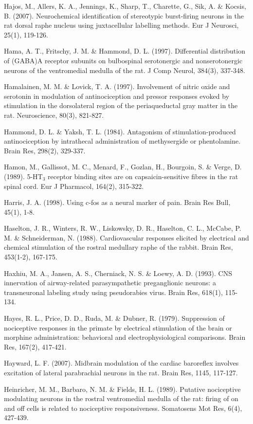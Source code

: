 \documentclass[a4paper,12pt,twoside]{report}
\begin{document}
\begin{singlespacing}
\begin{footnotesize}
Hajos, M., Allers, K. A., Jennings, K., Sharp, T., Charette, G., Sik, A. \& Kocsis, B. (2007). Neurochemical identification of stereotypic burst-firing neurons in the rat dorsal raphe nucleus using juxtacellular labelling methods. Eur J Neurosci, 25(1), 119-126.

Hama, A. T., Fritschy, J. M. \& Hammond, D. L. (1997). Differential distribution of (GABA)A receptor subunits on bulbospinal serotonergic and nonserotonergic neurons of the ventromedial medulla of the rat. J Comp Neurol, 384(3), 337-348.

Hamalainen, M. M. \& Lovick, T. A. (1997). Involvement of nitric oxide and serotonin in modulation of antinociception and pressor responses evoked by stimulation in the dorsolateral region of the periaqueductal gray matter in the rat. Neuroscience, 80(3), 821-827.

Hammond, D. L. \& Yaksh, T. L. (1984). Antagonism of stimulation-produced antinociception by intrathecal administration of methysergide or phentolamine. Brain Res, 298(2), 329-337.

Hamon, M., Gallissot, M. C., Menard, F., Gozlan, H., Bourgoin, S. \& Verge, D. (1989). 5-HT$_{3}$ receptor binding sites are on capsaicin-sensitive fibres in the rat spinal cord. Eur J Pharmacol, 164(2), 315-322.

Harris, J. A. (1998). Using c-fos as a neural marker of pain. Brain Res Bull, 45(1), 1-8.

Haselton, J. R., Winters, R. W., Liskowsky, D. R., Haselton, C. L., McCabe, P. M. \& Schneiderman, N. (1988). Cardiovascular responses elicited by electrical and chemical stimulation of the rostral medullary raphe of the rabbit. Brain Res, 453(1-2), 167-175.

Haxhiu, M. A., Jansen, A. S., Cherniack, N. S. \& Loewy, A. D. (1993). CNS innervation of airway-related parasympathetic preganglionic neurons: a transneuronal labeling study using pseudorabies virus. Brain Res, 618(1), 115-134.

Hayes, R. L., Price, D. D., Ruda, M. \& Dubner, R. (1979). Suppression of nociceptive responses in the primate by electrical stimulation of the brain or morphine administration: behavioral and electrophysiological comparisons. Brain Res, 167(2), 417-421.

Hayward, L. F. (2007). Midbrain modulation of the cardiac baroreflex involves excitation of lateral parabrachial neurons in the rat. Brain Res, 1145, 117-127.

Heinricher, M. M., Barbaro, N. M. \& Fields, H. L. (1989). Putative nociceptive modulating neurons in the rostral ventromedial medulla of the rat: firing of on and off cells is related to nociceptive responsiveness. Somatosens Mot Res, 6(4), 427-439.


\end{footnotesize}
\end{singlespacing}
\end{document}
